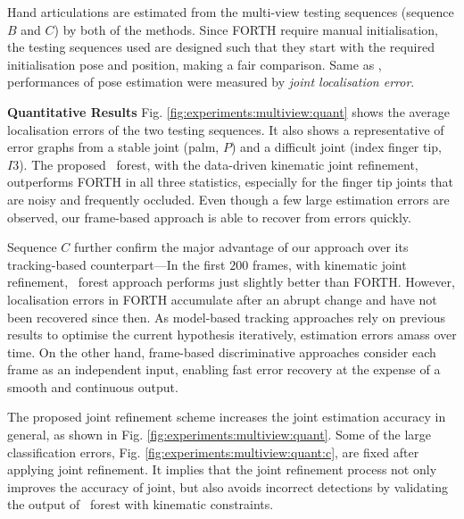 Hand articulations are estimated from the multi-view testing sequences (sequence $B$ and $C$) by both of the methods. 
Since FORTH require manual initialisation, the testing sequences used are designed such that they start with the required initialisation pose and position, making a fair comparison.   
Same as \cite{Oikonomidis_ICCV_11},  
performances of pose estimation were measured by \emph{joint localisation error}.

\noindent \textbf{Quantitative Results}
Fig. \ref{fig:experiments:multiview:quant} shows the average localisation errors of the two testing sequences. It also shows a representative of error graphs from a stable joint (palm, $P$) and a difficult joint (index finger tip, $I3$). The proposed \STR\ forest, with the data-driven kinematic joint refinement, outperforms FORTH in all three statistics, especially for the finger tip joints that are noisy and frequently occluded. Even though a few large estimation errors are observed, our frame-based approach is able to recover from errors quickly.    

Sequence $C$ further confirm the major advantage of our approach over its tracking-based counterpart---In the first $200$ frames, with kinematic joint refinement, \STR\ forest approach performs just slightly better than FORTH. However, localisation errors in FORTH accumulate after an abrupt change and have not been recovered since then. As model-based tracking approaches rely on previous results to optimise the current hypothesis iteratively, estimation errors amass over time. On the other hand, frame-based discriminative approaches consider each frame as an independent input, enabling fast error recovery at the expense of a smooth and continuous output. 

The proposed joint refinement scheme increases the joint estimation accuracy in general, as shown in Fig. \ref{fig:experiments:multiview:quant}. 
Some of the large classification errors, \eg Fig. \ref{fig:experiments:multiview:quant:c}, are fixed after applying joint refinement. It implies that the joint refinement process not only improves the accuracy of joint, but also avoids incorrect detections by validating the output of \STR\ forest with kinematic constraints.

